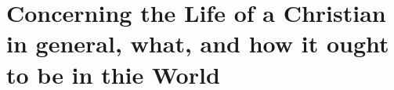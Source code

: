 \documentclass[../main.tex]{subfiles}
\begin{document}
	
	\chapter{Concerning the Life of a Christian in general, what, and how it ought to be in thie World}
	
	
	
	\theendnotes
	\setcounter{endnote}{0}
\end{document}
